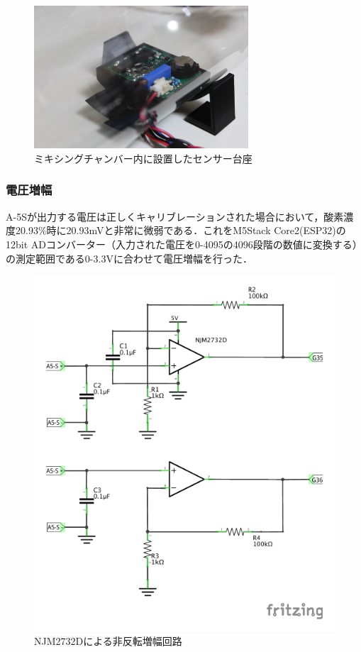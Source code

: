 \begin{figure}[H]
  \begin{center}
    \includegraphics[width=8cm]{fig/sensor_board}
    \caption{ミキシングチャンバー内に設置したセンサー台座}
    \label{fig:sensor_board}
  \end{center}
\end{figure}

\subsubsection{電圧増幅}
\label{sec:opamp}

A-5Sが出力する電圧は正しくキャリブレーションされた場合において，酸素濃度20.93\%時に20.93mVと非常に微弱である．これをM5Stack Core2(ESP32)の12bit ADコンバーター（入力された電圧を0-4095の4096段階の数値に変換する）の測定範囲である0-3.3Vに合わせて電圧増幅を行った．

\begin{figure}[H]
  \begin{center}
    \includegraphics[width=12cm]{fig/a-5s_opamp_schematic}
    \caption{NJM2732Dによる非反転増幅回路}
    \label{fig:a-5s_opamp_schematic}
  \end{center}
\end{figure}


